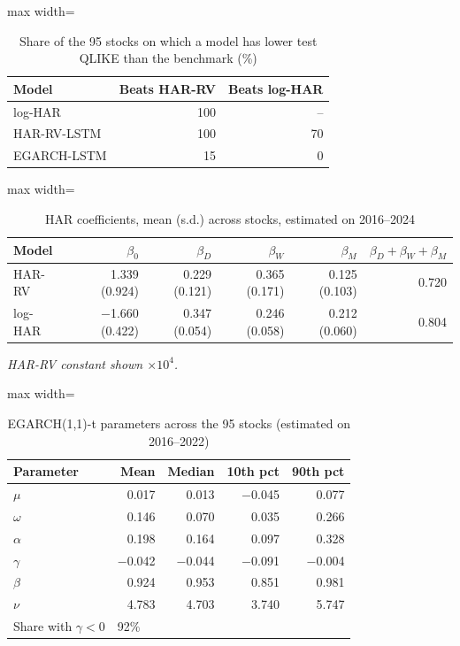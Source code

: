 \documentclass[11pt,a4paper]{article}
\begin{document}
\begin{table}[H]
\centering
\caption{Share of the 95 stocks on which a model has lower test QLIKE than the benchmark (\%)}
\label{tab:winrates}
\small
\begin{adjustbox}{max width=\textwidth}
\begin{tabular}{lrr}
\toprule
Model & Beats HAR-RV & Beats log-HAR \\
\midrule
log-HAR & 100 & -- \\
HAR-RV-LSTM & 100 & 70 \\
EGARCH-LSTM & 15 & 0 \\
\bottomrule
\end{tabular}
\end{adjustbox}
\end{table}

\begin{table}[H]
\centering
\caption{HAR coefficients, mean (s.d.) across stocks, estimated on 2016--2024}
\label{tab:harcoef}
\small
\begin{adjustbox}{max width=\textwidth}
\begin{tabular}{lrrrrr}
\toprule
Model & $\beta_0$ & $\beta_D$ & $\beta_W$ & $\beta_M$ & $\beta_D+\beta_W+\beta_M$ \\
\midrule
HAR-RV & 1.339 (0.924) & 0.229 (0.121) & 0.365 (0.171) & 0.125 (0.103) & 0.720 \\
log-HAR & $-$1.660 (0.422) & 0.347 (0.054) & 0.246 (0.058) & 0.212 (0.060) & 0.804 \\
\bottomrule
\end{tabular}
\end{adjustbox}
\par\smallskip\parbox{0.95\textwidth}{\footnotesize\itshape HAR-RV constant shown $\times10^{4}$.}
\end{table}

\begin{table}[H]
\centering
\caption{EGARCH(1,1)-t parameters across the 95 stocks (estimated on 2016--2022)}
\label{tab:egarch}
\small
\begin{adjustbox}{max width=\textwidth}
\begin{tabular}{lrrrr}
\toprule
Parameter & Mean & Median & 10th pct & 90th pct \\
\midrule
$\mu$ & 0.017 & 0.013 & $-$0.045 & 0.077 \\
$\omega$ & 0.146 & 0.070 & 0.035 & 0.266 \\
$\alpha$ & 0.198 & 0.164 & 0.097 & 0.328 \\
$\gamma$ & $-$0.042 & $-$0.044 & $-$0.091 & $-$0.004 \\
$\beta$ & 0.924 & 0.953 & 0.851 & 0.981 \\
$\nu$ & 4.783 & 4.703 & 3.740 & 5.747 \\
Share with $\gamma<0$ & \multicolumn{4}{l}{92\%} \\
\bottomrule
\end{tabular}
\end{adjustbox}
\end{table}
\end{document}
